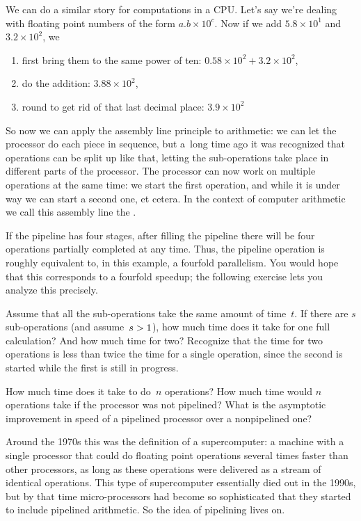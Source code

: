 We can do a similar story for computations in a CPU. Let's say we're
dealing with floating point numbers of the form $a.b\times 10^c$.  Now
if we add $5.8\times 10^1$ and $3.2\times 10^2$, we
\begin{enumerate}
\item first bring them to the same power of ten: $0.58\times
  10^2+3.2\times 10^2$,
\item do the addition: $3.88\times 10^2$,
\item round to get rid of that last decimal place: $3.9\times 10^2$
\end{enumerate}
So now we can apply the assembly line principle to arithmetic: 
we can let the processor do each piece in sequence, but
a~long time ago it was recognized that operations can be split up like that,
letting the sub-operations take place in different parts of the processor.
%
The processor can now work on multiple operations at the same time: we
start the first operation, and while it is under way we can start a
second one, et cetera.  In the context of computer arithmetic we call
this assembly line the .

If the pipeline has four stages, after filling the pipeline there will
be four operations partially completed at any time. Thus, the pipeline
operation is roughly equivalent to, in this example, a fourfold
parallelism. You would hope that this corresponds to a fourfold speedup; 
the following exercise lets you analyze this precisely.
\begin{exercise}
  Assume that all the sub-operations take the same amount of
  time~$t$. If there are $s$ sub-operations (and
  assume~$s>\nobreak1$), how much time does it take for one full
  calculation? And how much time for two? Recognize that the time
  for two operations is less than twice the time for a single operation,
  since the second is started while the first is still in progress.

  How much time does it take to do~$n$ operations? How much
  time would $n$ operations take if the processor was not pipelined?
  What is the asymptotic improvement in speed of a pipelined processor
  over a nonpipelined one?
\end{exercise}

Around the 1970s this was the definition of a supercomputer: a machine
with a single processor that could do floating point operations
several times faster than other processors, as long as these
operations were delivered as a stream of identical operations. This
type of supercomputer essentially died out in the 1990s, but by that
time micro-processors had become so sophisticated that they started to
include pipelined arithmetic. So the idea of pipelining lives on.

